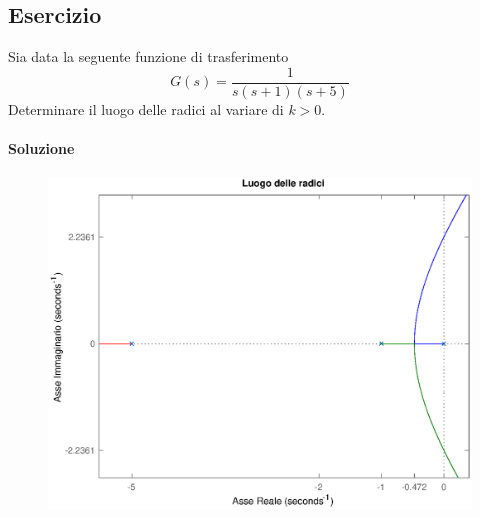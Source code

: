 \subsection{Esercizio}
Sia data la seguente funzione di trasferimento
\[
	G(s) = \frac{1}{s(s+1)(s+5)}
\]
Determinare il luogo delle radici al variare di \(k>0\).

\paragraph{Soluzione}

\begin{figure}[ht]
	\centering
	\includegraphics[scale=.6]{mod1/assets/rl_ex33}
\end{figure}

